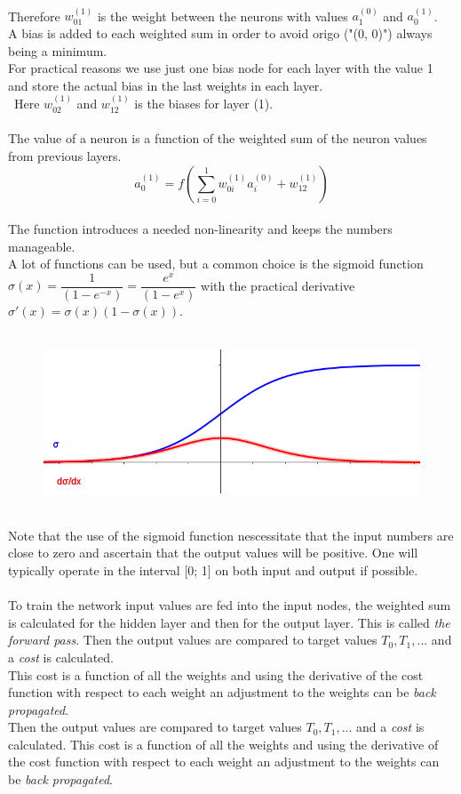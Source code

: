 \documentclass{article}
\begin{document}
\\
Therefore $w_{01}^{(1)}$ is the weight between the neurons with values $a_1^{(0)}$ and $a_0^{(1)}$.
\\
A bias is added to each weighted sum in order to avoid origo ("(0, 0)") always being a minimum.
\\
For practical reasons we use just one bias node for each layer with the value 1 and store the actual bias in the last weights in each layer. \\\
Here $w_{02}^{(1)}$ and $w_{12}^{(1)}$ is the biases for layer (1).
\\
\\ 
The value of a neuron is a function of the weighted sum of the neuron values from previous layers. $$a_0^{(1)} = f(\sum_{i=0}^{1}{w_{0i}^{(1)}a_i^{(0)}}+w_{12}^{(1)})$$
\\
The function introduces a needed non-linearity and keeps the numbers manageable.
\\
A lot of functions can be used, but a common choice is the sigmoid function $\sigma(x) = \dfrac{1}{(1-e^{-x})} = \dfrac{e^{x}}{(1-e^{x})}$ with the practical derivative $\sigma'(x) = \sigma(x)(1 - \sigma(x)) $.
\\
\\
\begin{figure}[h]
\includegraphics[scale=.5]{sigmoid}
\centering
\end{figure}
\\
Note that the use of the sigmoid function nescessitate that the input numbers are close to zero and ascertain that the output values will be positive. One will typically operate in the interval [0; 1] on both input and output if possible.
\\
\\
To train the network input values are fed into the input nodes, the weighted sum is calculated for the hidden layer and then for the output layer. This is called \textit{the forward pass}. Then the output values are compared to target values $T_0, T_1, ...$ and a \textit{cost} is calculated.
\\
This cost is a function of all the weights and using the derivative of the cost function with respect to each weight an adjustment to the weights can be \textit{back propagated}.
\\
Then the output values are compared to target values $T_0, T_1, ...$ and a \textit{cost} is calculated. This cost is a function of all the weights and using the derivative of the cost function with respect to each weight an adjustment to the weights can be \textit{back propagated}.
\\
\end{document}
